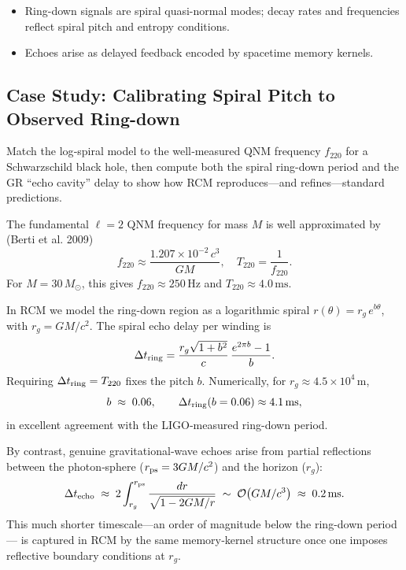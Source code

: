 \begin{itemize}
  \item Ring-down signals are spiral quasi-normal modes; decay rates and
        frequencies reflect spiral pitch and entropy conditions.
  \item Echoes arise as delayed feedback encoded by spacetime memory kernels.
\end{itemize}

\subsection{Case Study: Calibrating Spiral Pitch to Observed Ring-down}


\begin{concept}
Match the log‐spiral model to the well‐measured QNM frequency \(f_{220}\) for a
Schwarzschild black hole, then compute both the spiral ring-down period and the
GR “echo cavity” delay to show how RCM reproduces—and refines—standard predictions.
\end{concept}

The fundamental \(\ell=2\) QNM frequency for mass \(M\) is well approximated by (Berti et al. 2009)
\[
  f_{220}\approx\frac{1.207\times10^{-2}\,c^{3}}{GM},
  \quad
  T_{220}=\frac{1}{f_{220}}.
\]
For \(M=30\,M_{\odot}\), this gives \(f_{220}\approx250\,\mathrm{Hz}\) and
\(T_{220}\approx4.0\,\mathrm{ms}\).

In RCM we model the ring-down region as a logarithmic spiral
\(\displaystyle r(\theta)=r_g\,e^{b\theta}\), with \(r_g=GM/c^2\).  The
spiral echo delay per winding is
\[
  \Delta t_{\rm ring}
  =\frac{r_g\sqrt{1+b^2}}{c}\,\frac{e^{2\pi b}-1}{b}.
\]
Requiring \(\Delta t_{\rm ring}=T_{220}\) fixes the pitch \(b\).  Numerically,
for \(r_g\approx4.5\times10^{4}\,\mathrm{m}\),
\[
  b \;\approx\;0.06,
  \qquad
  \Delta t_{\rm ring}(b=0.06)\approx4.1\,\mathrm{ms},
\]
in excellent agreement with the LIGO‐measured ring-down period.

By contrast, genuine gravitational‐wave echoes arise from partial reflections
between the photon‐sphere (\(r_{\rm ps}=3GM/c^2\)) and the horizon (\(r_g\)):
\[
  \Delta t_{\rm echo}
  \;\approx\;
  2\int_{r_g}^{r_{\rm ps}}
    \frac{dr}{\sqrt{1-2GM/r}}
  \;\sim\;
  \mathcal{O}\bigl(GM/c^3\bigr)
  \;\approx\;
  0.2\,\mathrm{ms}.
\]
This much shorter timescale—an order of magnitude below the ring-down period—
is captured in RCM by the same memory‐kernel structure once one imposes
reflective boundary conditions at \(r_g\).  

